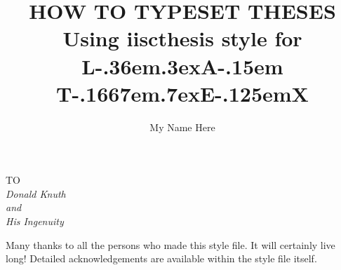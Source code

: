 \begin{frontmatter}
%
%

\title{HOW TO TYPESET THESES\\ 
	Using iiscthesis style for %
	{\LARGE {\rm L\kern-.36em\raise.3ex\hbox{\large A}\kern-.15em
	    T\kern-.1667em\lower.7ex\hbox{E}\kern-.125emX}}\\
	}
\author{My Name Here}
\enggfaculty
\iisclogotrue %
\tablespagetrue %
\maketitle
\begin{dedication}
\begin{center}
TO \\[2em]
\large\it Donald Knuth\\
and\\
\large\it His Ingenuity 
\end{center}
\end{dedication}
\acknowledgements

Many thanks to all the persons who made this style file. It will certainly
live long! Detailed acknowledgements are available within the style file itself.


\end{frontmatter}
